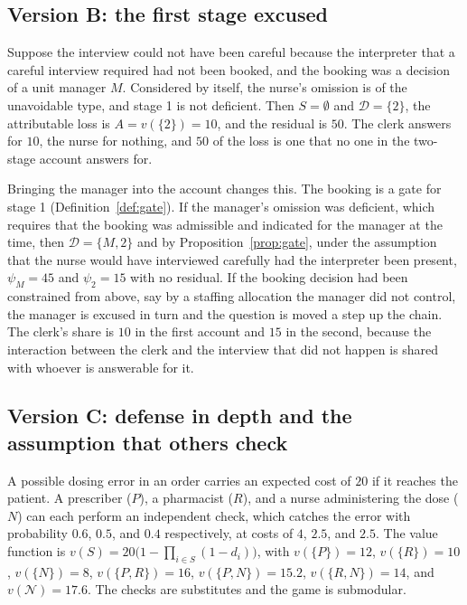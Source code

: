 \documentclass[11pt]{article}
\newcommand{\N}{\mathcal N}
\newcommand{\Dfc}{\mathcal D}
\theoremstyle{plain}
\theoremstyle{definition}
\begin{document}
\subsection*{Version B: the first stage excused}

Suppose the interview could not have been careful because the interpreter that a careful interview required had not been booked, and the booking was a decision of a unit manager $M$. Considered by itself, the nurse's omission is of the unavoidable type, and stage 1 is not deficient. Then $S=\emptyset$ and $\Dfc=\{2\}$, the attributable loss is $A=v(\{2\})=10$, and the residual is $50$. The clerk answers for $10$, the nurse for nothing, and $50$ of the loss is one that no one in the two-stage account answers for.

Bringing the manager into the account changes this. The booking is a gate for stage 1 (Definition~\ref{def:gate}). If the manager's omission was deficient, which requires that the booking was admissible and indicated for the manager at the time, then $\Dfc=\{M,2\}$ and by Proposition~\ref{prop:gate}, under the assumption that the nurse would have interviewed carefully had the interpreter been present, $\psi_M=45$ and $\psi_2=15$ with no residual. If the booking decision had been constrained from above, say by a staffing allocation the manager did not control, the manager is excused in turn and the question is moved a step up the chain. The clerk's share is $10$ in the first account and $15$ in the second, because the interaction between the clerk and the interview that did not happen is shared with whoever is answerable for it.

\subsection*{Version C: defense in depth and the assumption that others check}

A possible dosing error in an order carries an expected cost of $20$ if it reaches the patient. A prescriber ($P$), a pharmacist ($R$), and a nurse administering the dose ($N$) can each perform an independent check, which catches the error with probability $0.6$, $0.5$, and $0.4$ respectively, at costs of $4$, $2.5$, and $2.5$. The value function is $v(S)=20\bigl(1-\prod_{i\in S}(1-d_i)\bigr)$, with $v(\{P\})=12$, $v(\{R\})=10$, $v(\{N\})=8$, $v(\{P,R\})=16$, $v(\{P,N\})=15.2$, $v(\{R,N\})=14$, and $v(\N)=17.6$. The checks are substitutes and the game is submodular.
\end{document}
